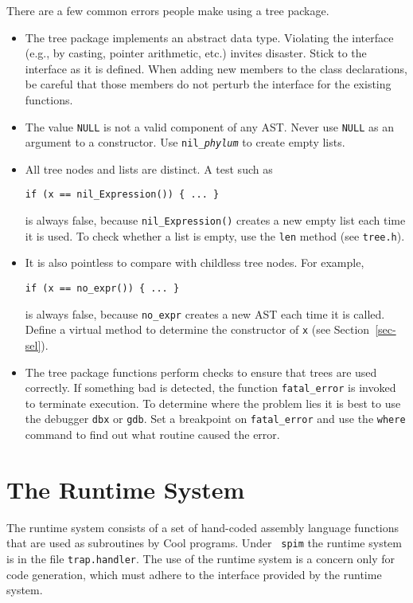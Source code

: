 There are a few common errors people make using a tree package.
\begin{itemize}

\item The tree package implements an abstract data type.  Violating
 the interface (e.g., by casting, pointer arithmetic, etc.)
invites disaster.  Stick to the interface as it is defined.
When adding new members to the class declarations, be careful that
those members do not perturb the interface for the existing functions.

\item The value {\tt NULL} is not a valid component of any AST.
Never use {\tt NULL} as an argument to a constructor.
Use {\tt nil\_{\em phylum}\(\)} to create empty lists.

\item All tree nodes and lists are distinct.  A test such as
\begin{verbatim}
if (x == nil_Expression()) { ... }
\end{verbatim}
is always false, because {\tt nil\_Expression()} creates a new empty list
each time it is used.  To check whether a list is empty, use the
{\tt len} method (see {\tt tree.h}).

\item It is also pointless to compare with childless tree nodes.
For example,
\begin{verbatim}
if (x == no_expr()) { ... }
\end{verbatim}
is always false, because {\tt no\_expr} creates a new AST each time
it is called.  Define a virtual method to determine
the constructor of {\tt x} (see Section~\ref{sec-sel}).

\item The tree package functions perform checks to ensure that trees
are used correctly.  If something bad is detected, the function
{\tt fatal\_error} is invoked to terminate execution.  To determine
where the problem lies it is best to use the debugger {\tt dbx} or {\tt gdb}.  Set a breakpoint on {\tt fatal\_error} and use the
{\tt where} command to find out what routine caused the error.
\end{itemize}

\section{The Runtime System}
\label{sec-runtime}

The runtime system consists of a set of hand-coded assembly language
functions that are used as subroutines by Cool programs.  Under {\tt
spim} the runtime system is in the file {\tt trap.handler}.  The use
of the runtime system is a concern only for code generation, which
must adhere to the interface provided by the runtime system.

